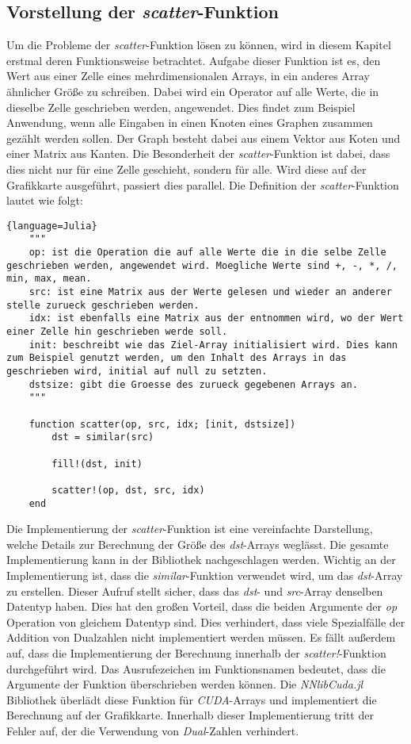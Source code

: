 \subsection{Vorstellung der \textit{scatter}-Funktion} \label{sec:vorstellung}

Um die Probleme der \textit{scatter}-Funktion lösen zu können, 
wird in diesem Kapitel erstmal deren Funktionsweise betrachtet.
Aufgabe dieser Funktion ist es, den Wert aus einer Zelle 
eines mehrdimensionalen Arrays, in ein anderes Array ähnlicher Größe zu schreiben.
Dabei wird ein Operator auf alle Werte, die in dieselbe Zelle
geschrieben werden, angewendet.
Dies findet zum Beispiel Anwendung, wenn alle Eingaben in einen Knoten eines Graphen zusammen gezählt werden sollen.
Der Graph besteht dabei aus einem Vektor aus Koten 
und einer Matrix aus Kanten.
Die Besonderheit der \textit{scatter}-Funktion ist dabei, 
dass dies nicht nur für eine Zelle geschieht, sondern für alle.
Wird diese auf der Grafikkarte ausgeführt, passiert dies parallel.
Die Definition der \textit{scatter}-Funktion lautet wie folgt:

\begin{lstlisting}{language=Julia}
	"""
	op: ist die Operation die auf alle Werte die in die selbe Zelle geschrieben werden, angewendet wird. Moegliche Werte sind +, -, *, /, min, max, mean.
	src: ist eine Matrix aus der Werte gelesen und wieder an anderer stelle zurueck geschrieben werden.
	idx: ist ebenfalls eine Matrix aus der entnommen wird, wo der Wert einer Zelle hin geschrieben werde soll.
	init: beschreibt wie das Ziel-Array initialisiert wird. Dies kann zum Beispiel genutzt werden, um den Inhalt des Arrays in das geschrieben wird, initial auf null zu setzten.
	dstsize: gibt die Groesse des zurueck gegebenen Arrays an.
	"""

	function scatter(op, src, idx; [init, dstsize])
		dst = similar(src)
		
		fill!(dst, init)
		
		scatter!(op, dst, src, idx)
	end
\end{lstlisting}

Die Implementierung der \textit{scatter}-Funktion ist eine vereinfachte Darstellung, 
welche Details zur Berechnung der Größe des \textit{dst}-Arrays weglässt.
Die gesamte Implementierung kann in der  Bibliothek \cite{nnlib} nachgeschlagen werden.
Wichtig an der Implementierung ist, dass die \textit{similar}-Funktion verwendet wird, um das
\textit{dst}-Array zu erstellen.
Dieser Aufruf stellt sicher, dass das \textit{dst}- und \textit{src}-Array denselben Datentyp haben.
Dies hat den großen Vorteil, 
dass die beiden Argumente der \textit{op} Operation von gleichem Datentyp sind.
Dies verhindert, 
dass viele Spezialfälle der Addition von Dualzahlen nicht implementiert werden müssen.
Es fällt außerdem auf, dass die Implementierung der Berechnung innerhalb der \textit{scatter!}-Funktion
durchgeführt wird.
Das Ausrufezeichen im Funktionsnamen bedeutet, dass die Argumente der Funktion überschrieben werden können.
Die \textit{NNlibCuda.jl} \cite{nnlibcuda} Bibliothek überlädt diese Funktion für \textit{CUDA}-Arrays und
implementiert die Berechnung auf der Grafikkarte.
Innerhalb dieser Implementierung tritt der Fehler auf, der die Verwendung von \textit{Dual}-Zahlen
verhindert.